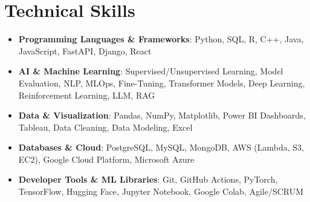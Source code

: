 \documentclass[letterpaper,11pt]{article}
\makeatletter
\newcommand{\resumeItem}[1]{\item\small{#1 \vspace{-4pt}}}
\newcommand{\resumeSubheading}[4]{
    \vspace{-2pt}\item
    \begin{tabular*}{1.0\textwidth}[t]{l@{\extracolsep{\fill}}r}
        \textbf{#1} & \textbf{\small #2} \\
        \textit{\small#3} & \textit{\small #4}
    \end{tabular*}\vspace{-7pt}
}
\newcommand{\resumeSubItem}[1]{\resumeItem{#1}\vspace{-4pt}}
\newcommand{\resumeSubHeadingListStart}{\begin{itemize}[leftmargin=0.0in, label={}]}
\newcommand{\resumeSubHeadingListEnd}{\end{itemize}}
\newcommand{\resumeItemListStart}{\begin{itemize}}
\newcommand{\resumeItemListEnd}{\end{itemize}\vspace{-7pt}}
\makeatother
\begin{document}




\vspace{-0.4cm}
\vspace{3pt}
\section{Technical Skills}
\resumeSubHeadingListStart
\resumeSubItem{\textbf{Programming Languages \& Frameworks}{: Python, SQL, R, C++, Java, JavaScript, FastAPI, Django, React}}
\vspace{4pt}
\resumeSubItem{\textbf{AI \& Machine Learning}{: Supervised/Unsupervised Learning, Model Evaluation, NLP, MLOps, Fine-Tuning, Transformer Models, Deep Learning, Reinforcement Learning, LLM, RAG}}
\vspace{4pt}
\resumeSubItem{\textbf{Data \& Visualization}{: Pandas, NumPy, Matplotlib, Power BI Dashboards, Tableau, Data Cleaning, Data Modeling, Excel}}
\vspace{4pt}
\resumeSubItem{\textbf{Databases \& Cloud}{: PostgreSQL, MySQL, MongoDB, AWS (Lambda, S3, EC2), Google Cloud Platform, Microsoft Azure}}
\vspace{4pt}
\resumeSubItem{\textbf{Developer Tools \& ML Libraries}{: Git, GitHub Actions, PyTorch, TensorFlow, Hugging Face, Jupyter Notebook, Google Colab, Agile/SCRUM}}
\resumeSubHeadingListEnd
\end{document}
